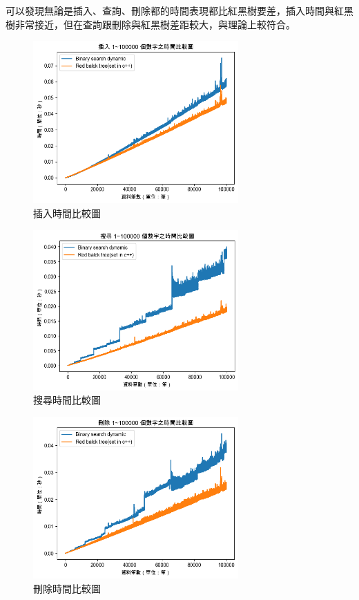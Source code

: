 \documentclass[12pt]{article}
\begin{document}
		可以發現無論是插入、查詢、刪除都的時間表現都比紅黑樹要差，插入時間與紅黑樹非常接近，但在查詢跟刪除與紅黑樹差距較大，與理論上較符合。
		
		\begin{figure}[H]
			\centering
			\includegraphics[width=0.7\textwidth]{insert.png}
			\caption{插入時間比較圖} %
			\label{Fig.main1} %
		\end{figure}
		
		\begin{figure}[H]
			\centering
			\includegraphics[width=0.7\textwidth]{search.png}
			\caption{搜尋時間比較圖} %
			\label{Fig.main2} %
		\end{figure}
		\begin{figure}[H]
			\centering
			\includegraphics[width=0.7\textwidth]{delete.png}
			\caption{刪除時間比較圖} %
			\label{Fig.main3} %
		\end{figure}
\end{document}
